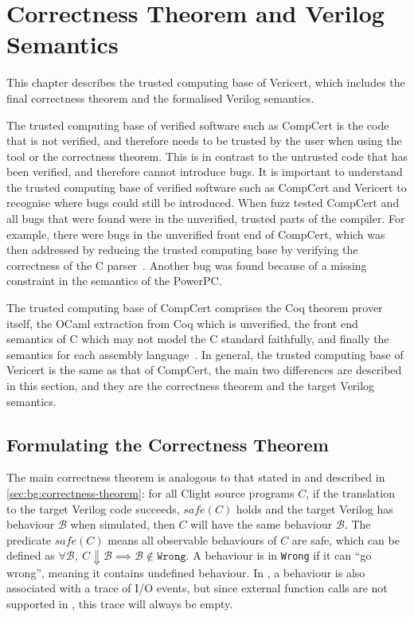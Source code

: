 \chapter{Correctness Theorem and Verilog Semantics}%
\label{sec:trusted-computing-base}

\begin{chapsummary}
  This chapter describes the trusted computing base of Vericert, which includes
  the final correctness theorem and the formalised Verilog semantics.
\end{chapsummary}

\noindent The trusted computing base of verified software such as CompCert is
the code that is not verified, and therefore needs to be trusted by the user
when using the tool or the correctness theorem.  This is in contrast to the
untrusted code that has been verified, and therefore cannot introduce bugs.  It
is important to understand the trusted computing base of verified software such
as CompCert and Vericert to recognise where bugs could still be introduced.
When \textcite{yang11_findin_under_bugs_c_compil} fuzz tested CompCert and all
bugs that were found were in the unverified, trusted parts of the compiler.  For
example, there were bugs in the unverified front end of CompCert, which was then
addressed by reducing the trusted computing base by verifying the correctness of
the C parser~\cite{jourdan12_valid_lr_parser}.  Another bug was found because of
a missing constraint in the semantics of the PowerPC.

The trusted computing base of CompCert comprises the Coq theorem prover itself,
the OCaml extraction from Coq which is unverified, the front end semantics of C
which may not model the C standard faithfully, and finally the semantics for
each assembly language~\cite{monniaux22_tcbcvc}.  In general, the trusted
computing base of Vericert is the same as that of CompCert, the main two
differences are described in this section, and they are the correctness theorem
and the target Verilog semantics.

\section{Formulating the Correctness Theorem}

The main correctness theorem is analogous to that stated in \compcert{} and
described in \cref{sec:bg:correctness-theorem}: for all \gls{Clight} source programs
$C$, if the translation to the target Verilog code succeeds, $\mathit{safe}(C)$
holds and the target Verilog has behaviour $\mathcal{B}$ when simulated, then
$C$ will have the same behaviour $\mathcal{B}$.  The predicate
$\mathit{safe}(C)$ means all observable behaviours of $C$ are safe, which can be
defined as
$\forall \mathcal{B},\ C \Downarrow \mathcal{B} \implies \mathcal{B} \not\in
\texttt{Wrong}$.  A behaviour is in \texttt{Wrong} if it can \enquote{go wrong},
meaning it contains undefined behaviour.  In \compcert{}, a behaviour is also
associated with a trace of I/O events, but since external function calls are not
supported in \vericert{}, this trace will always be empty.

